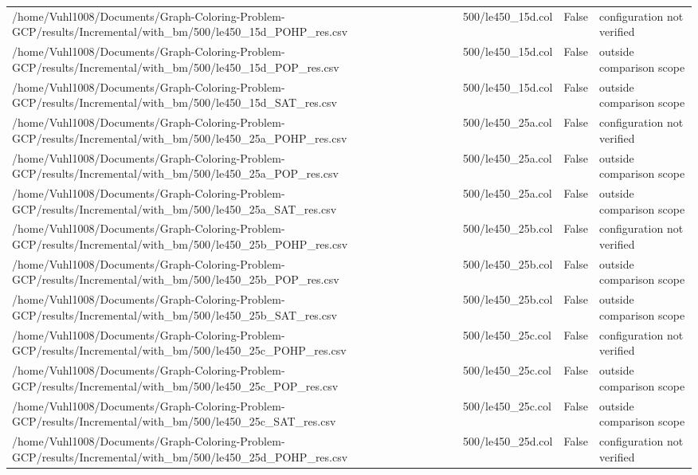 \begin{table}[htbp]
\begin{tabular}{llll}
/home/Vuhl1008/Documents/Graph-Coloring-Problem-GCP/results/Incremental/with\_bm/500/le450\_15d\_POHP\_res.csv & 500/le450\_15d.col & False & configuration not verified \\
/home/Vuhl1008/Documents/Graph-Coloring-Problem-GCP/results/Incremental/with\_bm/500/le450\_15d\_POP\_res.csv & 500/le450\_15d.col & False & outside comparison scope \\
/home/Vuhl1008/Documents/Graph-Coloring-Problem-GCP/results/Incremental/with\_bm/500/le450\_15d\_SAT\_res.csv & 500/le450\_15d.col & False & outside comparison scope \\
/home/Vuhl1008/Documents/Graph-Coloring-Problem-GCP/results/Incremental/with\_bm/500/le450\_25a\_POHP\_res.csv & 500/le450\_25a.col & False & configuration not verified \\
/home/Vuhl1008/Documents/Graph-Coloring-Problem-GCP/results/Incremental/with\_bm/500/le450\_25a\_POP\_res.csv & 500/le450\_25a.col & False & outside comparison scope \\
/home/Vuhl1008/Documents/Graph-Coloring-Problem-GCP/results/Incremental/with\_bm/500/le450\_25a\_SAT\_res.csv & 500/le450\_25a.col & False & outside comparison scope \\
/home/Vuhl1008/Documents/Graph-Coloring-Problem-GCP/results/Incremental/with\_bm/500/le450\_25b\_POHP\_res.csv & 500/le450\_25b.col & False & configuration not verified \\
/home/Vuhl1008/Documents/Graph-Coloring-Problem-GCP/results/Incremental/with\_bm/500/le450\_25b\_POP\_res.csv & 500/le450\_25b.col & False & outside comparison scope \\
/home/Vuhl1008/Documents/Graph-Coloring-Problem-GCP/results/Incremental/with\_bm/500/le450\_25b\_SAT\_res.csv & 500/le450\_25b.col & False & outside comparison scope \\
/home/Vuhl1008/Documents/Graph-Coloring-Problem-GCP/results/Incremental/with\_bm/500/le450\_25c\_POHP\_res.csv & 500/le450\_25c.col & False & configuration not verified \\
/home/Vuhl1008/Documents/Graph-Coloring-Problem-GCP/results/Incremental/with\_bm/500/le450\_25c\_POP\_res.csv & 500/le450\_25c.col & False & outside comparison scope \\
/home/Vuhl1008/Documents/Graph-Coloring-Problem-GCP/results/Incremental/with\_bm/500/le450\_25c\_SAT\_res.csv & 500/le450\_25c.col & False & outside comparison scope \\
/home/Vuhl1008/Documents/Graph-Coloring-Problem-GCP/results/Incremental/with\_bm/500/le450\_25d\_POHP\_res.csv & 500/le450\_25d.col & False & configuration not verified \\

\end{tabular}
\end{table}
